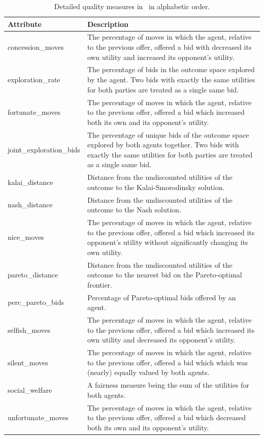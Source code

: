 \documentclass[]{article}
\begin{document}
\begin{table}[h!]
	\small
	\center
	\begin{tabular}{|p{4.7cm}|p{9.2cm}|}
		\hline\hline
		\textbf{Attribute} & \textbf{Description}\\[-0.2ex] 
		\hline\hline
		concession\_moves & The percentage of moves in which the agent, relative to the previous offer, offered a bid with decreased its own utility and increased its opponent's utility.\\[-0.3ex]\hline
		exploration\_rate & The percentage of bids in the outcome space explored by the agent. Two bids with exactly the same utilities for both parties are treated as a single same bid.\\[-0.3ex]\hline
		fortunate\_moves & The percentage of moves in which the agent, relative to the previous offer, offered a bid which increased both its own and its opponent's utility.\\[-0.3ex]\hline
		joint\_exploration\_bids & The percentage of unique bids of the outcome space explored by both agents together. Two bids with exactly the same utilities for both parties are treated as a single same bid. \\[-0.3ex]\hline
		kalai\_distance & Distance from the undiscounted utilities of the outcome to the Kalai-Smorodinsky solution.\\[-0.3ex]\hline
		nash\_distance & Distance from the undiscounted utilities of the outcome to the Nash solution. \\[-0.3ex]\hline
		nice\_moves & The percentage of moves in which the agent, relative to the previous offer, offered a bid which increased its opponent's utility without significantly changing its own utility.\\[-0.3ex]\hline
		pareto\_distance & Distance from the undiscounted utilities of the outcome to the nearest bid on the Pareto-optimal frontier.\\[-0.3ex]\hline
		perc\_pareto\_bids & Percentage of Pareto-optimal bids offered by an agent.\\[-0.3ex]\hline
		selfish\_moves & The percentage of moves in which the agent, relative to the previous offer, offered a bid which increased its own utility and decreased its opponent's utility.\\[-0.3ex]\hline
		silent\_moves & The percentage of moves in which the agent, relative to the previous offer, offered a bid which which was (nearly) equally valued by both agents.\\[-0.3ex]\hline
		social\_welfare & A fairness measure being the sum of the utilities for both agents.\\[-0.3ex]\hline
		unfortunate\_moves & The percentage of moves in which the agent, relative to the previous offer, offered a bid which decreased both its own and its opponent's utility.\\[-0.3ex]
		\hline
		\hline
	\end{tabular}
	\caption{Detailed quality measures in \Genius~in alphabetic order.}
	\label{tab:detailedMeasures}
\end{table}
\end{document}
